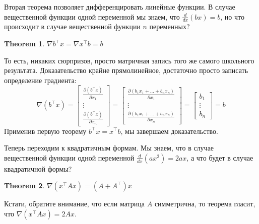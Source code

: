 \documentclass{article}
\newtheorem{theorem}{Theorem}
\begin{document}
Вторая теорема позволяет дифференцировать линейные функции. В случае вещественной функции одной переменной мы знаем, что $\frac{d}{dx}(bx) = b$, но что происходит в случае вещественной функции $n$ переменных?
\begin{theorem}
$\nabla b^\top x = \nabla x^\top b = b$
\end{theorem}
То есть, никаких сюрпризов, просто матричная запись того же самого школьного результата. Доказательство крайне прямолинейное, достаточно просто записать определение градиента:
$$\nabla(b^\top x) = \begin{bmatrix}\frac{\partial (b^\top x)}{\partial x_1} \\ \vdots \\ \frac{\partial (b^\top x)}{\partial x_n} \end{bmatrix} = \begin{bmatrix}\frac{\partial (b_1 x_1 + \dots + b_n x_n)}{\partial x_1} \\ \vdots \\ \frac{\partial (b_1 x_1 + \dots + b_n x_n)}{\partial x_n} \end{bmatrix}
= \begin{bmatrix}b_1 \\ \vdots \\ b_n \end{bmatrix} = b$$
Применив первую теорему $b^\top x = x^\top b$, мы завершаем доказательство.

Теперь переходим к квадратичным формам. Мы знаем, что в случае вещественной функции одной переменной $\frac{d}{dx}(ax^2) = 2ax$, а что будет в случае квадратичной формы?
\begin{theorem}
$\nabla (x^\top A x) = (A+A^\top)x$
\end{theorem}
Кстати, обратите внимание, что если матрица $A$ симметрична, то теорема гласит, что $\nabla (x^\top A x) = 2Ax$.
\end{document}
